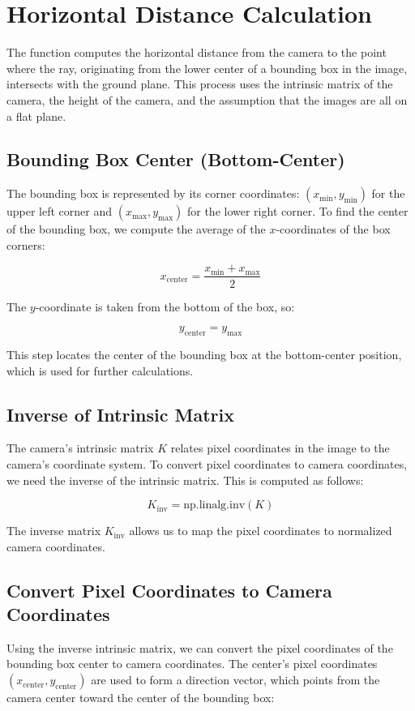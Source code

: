 \documentclass[a4paper,twocolumn]{article}
\begin{document}
\section{Horizontal Distance Calculation}

The function computes the horizontal distance from the camera to the point where the ray, originating from the lower center of a bounding box in the image, intersects with the ground plane. This process uses the intrinsic matrix of the camera, the height of the camera, and the assumption that the images are all on a flat plane. 

\subsection{Bounding Box Center (Bottom-Center)}
The bounding box is represented by its corner coordinates: \((x_{\text{min}}, y_{\text{min}})\) for the upper left corner and \((x_{\text{max}}, y_{\text{max}})\) for the lower right corner. To find the center of the bounding box, we compute the average of the \(x\)-coordinates of the box corners:

\[
x_{\text{center}} = \frac{x_{\text{min}} + x_{\text{max}}}{2}
\]

The \(y\)-coordinate is taken from the bottom of the box, so:

\[
y_{\text{center}} = y_{\text{max}}
\]

This step locates the center of the bounding box at the bottom-center position, which is used for further calculations.

\subsection{Inverse of Intrinsic Matrix}
The camera’s intrinsic matrix \(K\) relates pixel coordinates in the image to the camera's coordinate system. To convert pixel coordinates to camera coordinates, we need the inverse of the intrinsic matrix. This is computed as follows:

\[
K_{\text{inv}} = \text{np.linalg.inv}(K)
\]

The inverse matrix \(K_{\text{inv}}\) allows us to map the pixel coordinates to normalized camera coordinates.

\subsection{Convert Pixel Coordinates to Camera Coordinates}
Using the inverse intrinsic matrix, we can convert the pixel coordinates of the bounding box center to camera coordinates. The center's pixel coordinates \((x_{\text{center}}, y_{\text{center}})\) are used to form a direction vector, which points from the camera center toward the center of the bounding box:
\end{document}
